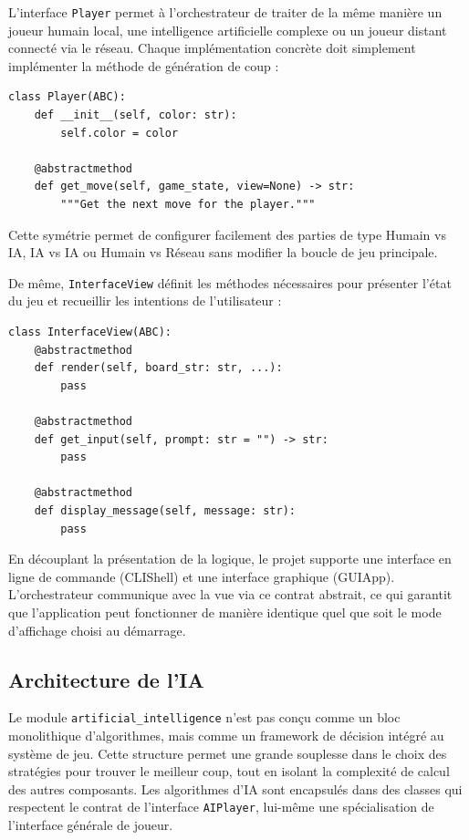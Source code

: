 \documentclass[a4paper]{article}
\begin{document}
L'interface \texttt{Player} permet à l'orchestrateur de traiter de la même manière un joueur humain local, une intelligence artificielle complexe ou un joueur distant connecté via le réseau. Chaque implémentation concrète doit simplement implémenter la méthode de génération de coup :

\begin{verbatim}
class Player(ABC):
    def __init__(self, color: str):
        self.color = color

    @abstractmethod
    def get_move(self, game_state, view=None) -> str:
        """Get the next move for the player."""
\end{verbatim}

Cette symétrie permet de configurer facilement des parties de type Humain vs IA, IA vs IA ou Humain vs Réseau sans modifier la boucle de jeu principale.

De même, \texttt{InterfaceView} définit les méthodes nécessaires pour présenter l'état du jeu et recueillir les intentions de l'utilisateur :

\begin{verbatim}
class InterfaceView(ABC):
    @abstractmethod
    def render(self, board_str: str, ...):
        pass

    @abstractmethod
    def get_input(self, prompt: str = "") -> str:
        pass
    
    @abstractmethod
    def display_message(self, message: str):
        pass
\end{verbatim}

En découplant la présentation de la logique, le projet supporte une interface en ligne de commande (CLIShell) et une interface graphique (GUIApp). L'orchestrateur communique avec la vue via ce contrat abstrait, ce qui garantit que l'application peut fonctionner de manière identique quel que soit le mode d'affichage choisi au démarrage.

\subsection{Architecture de l'IA}

Le module \texttt{artificial\_intelligence} n'est pas conçu comme un bloc monolithique d'algorithmes, mais comme un framework de décision intégré au système de jeu. Cette structure permet une grande souplesse dans le choix des stratégies pour trouver le meilleur coup, tout en isolant la complexité de calcul des autres composants. Les algorithmes d'IA sont encapsulés dans des classes qui respectent le contrat de l'interface \texttt{AIPlayer}, lui-même une spécialisation de l'interface générale de joueur.
\end{document}

